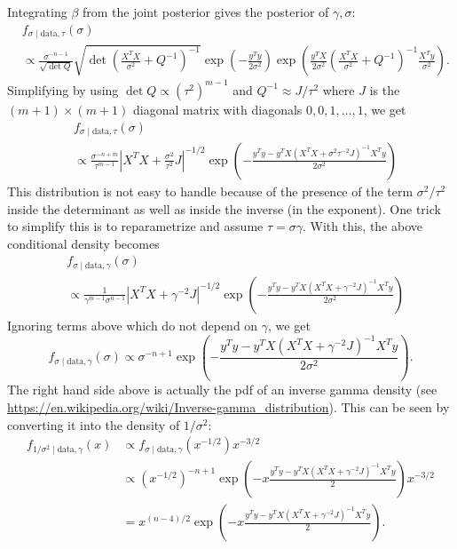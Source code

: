 \documentclass{scrartcl}
\begin{document}
Integrating $\beta$ from the joint posterior gives the posterior of
$\gamma, \sigma$:
\begin{align*}
&  f_{\sigma \mid \text{data}, \tau}(\sigma) \\ &\propto
  \frac{\sigma^{-n-1}}{\sqrt{\det Q}}  \sqrt{\det
  \left(\frac{X^T X}{\sigma^2} + Q^{-1} \right)^{-1}} \exp \left(-\frac{y^T y}{2 \sigma^2} \right)\exp
  \left(\frac{y^T X}{2\sigma^2} \left(\frac{X^T 
  X}{\sigma^2} + 
   Q^{-1} \right)^{-1} \frac{X^T y}{\sigma^2}  \right). 
\end{align*}
Simplifying by using $\det Q \propto (\tau^2)^{m-1}$ and
$Q^{-1} \approx J/\tau^2$ where $J$ is the $(m+1) \times
(m+1)$ diagonal matrix with diagonals $0, 0, 1, \dots, 1$, we get
\begin{align*}
  &  f_{\sigma \mid \text{data}, \tau}(\sigma) \\ &\propto
\frac{\sigma^{-n+m}}{\tau^{m-1}} \left|X^T X + \frac{\sigma^2}{\tau^2}
                                                    J 
  \right|^{-1/2} \exp 
  \left(-\frac{y^T y - y^T X \left(X^T X + 
 \sigma^2\tau^{-2} J \right)^{-1} X^T y}{2\sigma^2} 
  \right) 
\end{align*}
This distribution is not easy to handle because of the presence of the
term $\sigma^2/\tau^2$ inside the determinant as well as inside the
inverse (in the exponent). One trick to simplify this is to
reparametrize and assume $\tau = \sigma \gamma$. With this, the above
conditional density becomes
\begin{align*}
  &  f_{\sigma \mid \text{data}, \gamma}(\sigma) \\ &\propto
\frac{1}{\gamma^{m-1}\sigma^{n-1}} \left|X^T X + \gamma^{-2} J 
  \right|^{-1/2} \exp 
  \left(-\frac{y^T y - y^T X \left(X^T X + 
\gamma^{-2} J \right)^{-1} X^T y}{2\sigma^2} 
  \right) 
\end{align*}
Ignoring terms above which do not depend on $\gamma$, we get 
\begin{equation*}
  f_{\sigma \mid \text{data}, \gamma}(\sigma) \propto \sigma^{-n+1} \exp 
  \left(-\frac{y^T y - y^T X \left(X^T X + 
 \gamma^{-2} J \right)^{-1} X^T y}{2\sigma^2} 
  \right). 
\end{equation*}
The right hand side above is actually the pdf of an inverse gamma
density (see
\url{https://en.wikipedia.org/wiki/Inverse-gamma_distribution}). This
can be seen by converting it into the density of $1/\sigma^2$:
\begin{align*}
  f_{1/\sigma^2 \mid \text{data}, \gamma}(x) &\propto f_{\sigma \mid
  \text{data}, \gamma}(x^{-1/2}) x^{-3/2} \\
  &\propto \left(x^{-1/2} \right)^{-n+1} \exp 
  \left(-x \frac{y^T y - y^T X \left(X^T X + 
 \gamma^{-2} J \right)^{-1} X^T y}{2} 
    \right) x^{-3/2} \\
  &= x^{(n-4)/2} \exp 
  \left(-x \frac{y^T y - y^T X \left(X^T X + 
 \gamma^{-2} J \right)^{-1} X^T y}{2} 
    \right). 
\end{align*}
\end{document}

